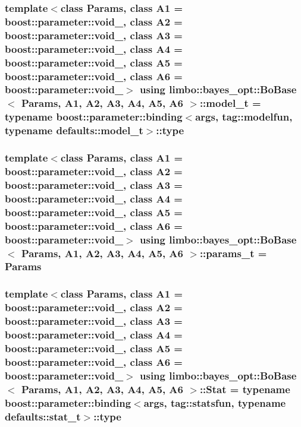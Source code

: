 \subsubsection[{model\+\_\+t}]{\setlength{\rightskip}{0pt plus 5cm}template$<$class Params, class A1 = boost\+::parameter\+::void\+\_\+, class A2 = boost\+::parameter\+::void\+\_\+, class A3 = boost\+::parameter\+::void\+\_\+, class A4 = boost\+::parameter\+::void\+\_\+, class A5 = boost\+::parameter\+::void\+\_\+, class A6 = boost\+::parameter\+::void\+\_\+$>$ using {\bf limbo\+::bayes\+\_\+opt\+::\+Bo\+Base}$<$ Params, A1, A2, A3, A4, A5, A6 $>$\+::{\bf model\+\_\+t} =  typename boost\+::parameter\+::binding$<${\bf args}, tag\+::modelfun, typename {\bf defaults\+::model\+\_\+t}$>$\+::type}\label{classlimbo_1_1bayes__opt_1_1_bo_base_a5e23d523dd2a16b866a2660721b937bb}
\hypertarget{classlimbo_1_1bayes__opt_1_1_bo_base_ad64c1fe61c97f4540914018439f96a0a}{}
\subsubsection[{params\+\_\+t}]{\setlength{\rightskip}{0pt plus 5cm}template$<$class Params, class A1 = boost\+::parameter\+::void\+\_\+, class A2 = boost\+::parameter\+::void\+\_\+, class A3 = boost\+::parameter\+::void\+\_\+, class A4 = boost\+::parameter\+::void\+\_\+, class A5 = boost\+::parameter\+::void\+\_\+, class A6 = boost\+::parameter\+::void\+\_\+$>$ using {\bf limbo\+::bayes\+\_\+opt\+::\+Bo\+Base}$<$ Params, A1, A2, A3, A4, A5, A6 $>$\+::{\bf params\+\_\+t} =  Params}\label{classlimbo_1_1bayes__opt_1_1_bo_base_ad64c1fe61c97f4540914018439f96a0a}
\hypertarget{classlimbo_1_1bayes__opt_1_1_bo_base_a4dfe2a37a52a4a964bce83cc580bff2e}{}
\subsubsection[{Stat}]{\setlength{\rightskip}{0pt plus 5cm}template$<$class Params, class A1 = boost\+::parameter\+::void\+\_\+, class A2 = boost\+::parameter\+::void\+\_\+, class A3 = boost\+::parameter\+::void\+\_\+, class A4 = boost\+::parameter\+::void\+\_\+, class A5 = boost\+::parameter\+::void\+\_\+, class A6 = boost\+::parameter\+::void\+\_\+$>$ using {\bf limbo\+::bayes\+\_\+opt\+::\+Bo\+Base}$<$ Params, A1, A2, A3, A4, A5, A6 $>$\+::{\bf Stat} =  typename boost\+::parameter\+::binding$<${\bf args}, tag\+::statsfun, typename {\bf defaults\+::stat\+\_\+t}$>$\+::type}\label{classlimbo_1_1bayes__opt_1_1_bo_base_a4dfe2a37a52a4a964bce83cc580bff2e}
\hypertarget{classlimbo_1_1bayes__opt_1_1_bo_base_a407dede091900c86f4bf8001273c26e2}{}
